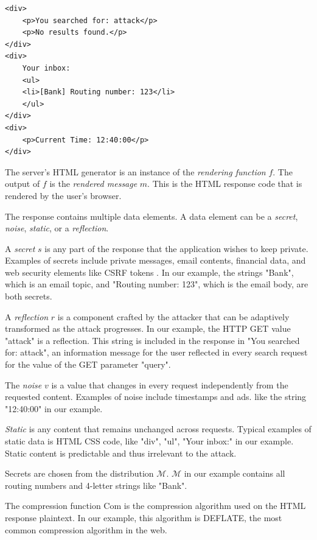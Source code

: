 \begin{lstlisting}[basicstyle=\small\ttfamily]
<div>
    <p>You searched for: attack</p>
    <p>No results found.</p>
</div>
<div>
    Your inbox:
    <ul>
    <li>[Bank] Routing number: 123</li>
    </ul>
</div>
<div>
    <p>Current Time: 12:40:00</p>
</div>
\end{lstlisting}

The server's HTML generator is an instance of the \textit{rendering function}
$f$.  The output of $f$ is the \textit{rendered message} $m$. This is the HTML
response code that is rendered by the user's browser.

The response contains multiple data elements. A data element can be a
\textit{secret}, \textit{noise}, \textit{static}, or a \textit{reflection}.

A \textit{secret} $s$ is any part of the response that the application wishes to
keep private. Examples of secrets include private messages, email contents,
financial data, and web security elements like CSRF tokens
\cite{de2011automatic}. In our example, the strings "Bank", which is an email
topic, and "Routing number: 123", which is the email body, are both secrets.

A \textit{reflection} $r$ is a component crafted by the attacker that can be
adaptively transformed as the attack progresses. In our example, the HTTP GET
value "attack" is a reflection. This string is included in the response in "You
searched for: attack", an information message for the user reflected in every
search request for the value of the GET parameter "query".

The \textit{noise} $v$ is a value that changes in every request independently
from the requested content. Examples of noise include timestamps and ads. like
the string "12:40:00" in our example.

\textit{Static} is any content that remains unchanged across requests. Typical
examples of static data is HTML CSS code, like "div", "ul", "Your inbox:" in our
example. Static content is predictable and thus irrelevant to the attack.

Secrets are chosen from the distribution $\mathcal{M}$. $\mathcal{M}$ in our
example contains all routing numbers and 4-letter strings like "Bank".

The compression function $\textrm{Com}$ is the compression algorithm used on the
HTML response plaintext. In our example, this algorithm is DEFLATE, the most
common compression algorithm in the web.

